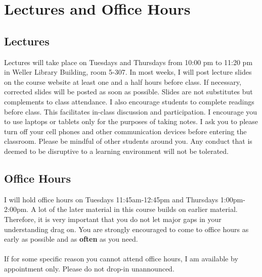 \documentclass[letterpaper,12pt]{article}
\theoremstyle{dotlessS}
\begin{document}
\section{Lectures and Office Hours}

\subsection*{Lectures}
Lectures will take place on Tuesdays and Thursdays from 10:00 pm to 11:20 pm in Weller Library Building, room 5-307. In most weeks, I will post lecture slides on the course website at least one and a half hours before class. If necessary, corrected slides will be posted as soon as possible. Slides are not
substitutes but complements to class attendance. I also encourage students to complete readings before class. This facilitates in-class discussion and participation. I encourage you to use laptops or tablets only for the purposes of taking notes. I ask you to please turn off your cell phones and
other communication devices before entering the classroom. Please be mindful of other students around you. Any conduct that is deemed to be disruptive to a learning environment will not be tolerated.


\subsection*{Office Hours}
I will hold office hours on Tuesdays 11:45am-12:45pm and Thursdays 1:00pm-2:00pm. A lot of the later material in this course builds on earlier material. Therefore, it is very important that you do not let major gaps in your understanding drag on. You are strongly encouraged to come to office hours as early as possible and as \textbf{often} as you need.\\
\\
\noindent If for some specific reason you cannot attend office hours, I am available by appointment only. Please do not drop-in unannounced.

\newpage
\end{document}
